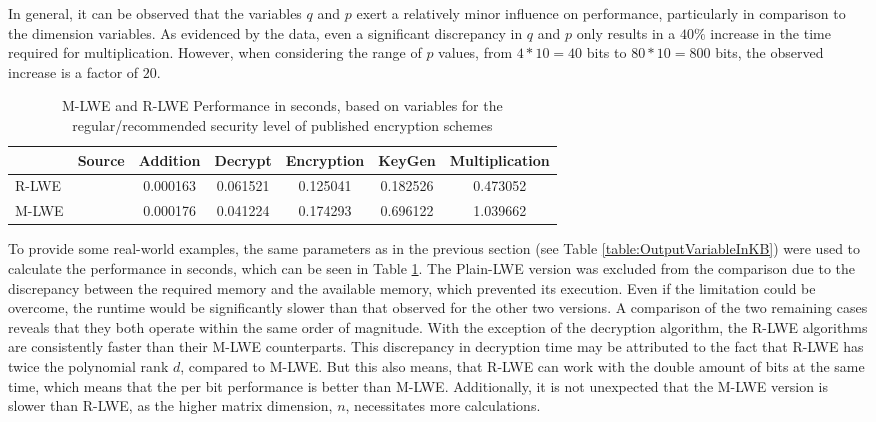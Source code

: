 In general, it can be observed that the variables $q$ and $p$ exert a relatively minor influence on performance, particularly in comparison to the dimension variables. As evidenced by the data, even a significant discrepancy in $q$ and $p$ only results in a $40\%$ increase in the time required for multiplication. However, when considering the range of $p$ values, from $4*10=40$ bits to $80*10=800$ bits, the observed increase is a factor of $20$.


\begin{table}[h]
  \centering
  \caption{M-LWE and R-LWE Performance in seconds, based on variables for the regular/recommended security level of published encryption schemes}
  \begin{tabular}{|l|c||c|c|c|c|c|}
    \toprule
          & Source                      & Addition & Decrypt  & Encryption & KeyGen   & Multiplication \\
    \midrule
    R-LWE & \cite{PracticalKeyExchange} & 0.000163 & 0.061521 & 0.125041   & 0.182526 & 0.473052       \\
    M-LWE & \cite{CyrstalsKyber}        & 0.000176 & 0.041224 & 0.174293   & 0.696122 & 1.039662       \\
    \bottomrule
  \end{tabular}
  \label{table:performanceComparison}
\end{table}

To provide some real-world examples, the same parameters as in the previous section (see Table \ref{table:OutputVariableInKB}) were used to calculate the performance in seconds, which can be seen in Table \ref{table:performanceComparison}. The Plain-LWE version was excluded from the comparison due to the discrepancy between the required memory and the available memory, which prevented its execution. Even if the limitation could be overcome, the runtime would be significantly slower than that observed for the other two versions. A comparison of the two remaining cases reveals that they both operate within the same order of magnitude. With the exception of the decryption algorithm, the R-LWE algorithms are consistently faster than their M-LWE counterparts. This discrepancy in decryption time may be attributed to the fact that R-LWE has twice the polynomial rank $d$, compared to M-LWE. But this also means, that R-LWE can work with the double amount of bits at the same time, which means that the per bit performance is better than M-LWE.  Additionally, it is not unexpected that the M-LWE version is slower than R-LWE, as the higher matrix dimension, $n$, necessitates more calculations.

